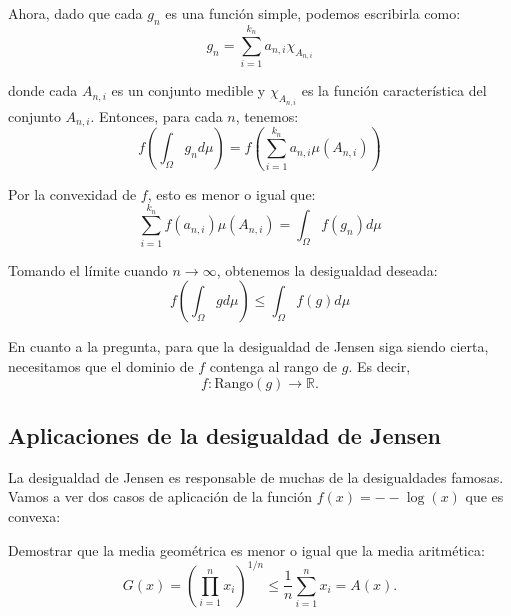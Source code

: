 \begin{paracol}{2}
{\begin{ejer}
Ahora, dado que cada $g_n$ es una función simple, podemos escribirla como:
$$g_n = \sum_{i=1}^{k_n} a_{n,i} \chi_{A_{n,i}}$$

donde cada $A_{n,i}$ es un conjunto medible y $\chi_{A_{n,i}}$ es la función característica del conjunto $A_{n,i}$. Entonces, para cada $n$, tenemos:
$$f\left(\int_\Omega g_n d\mu\right) = f\left(\sum_{i=1}^{k_n} a_{n,i} \mu(A_{n,i})\right)$$

Por la convexidad de $f$, esto es menor o igual que:
$$\sum_{i=1}^{k_n} f(a_{n,i}) \mu(A_{n,i}) = \int_\Omega f(g_n) d\mu$$

Tomando el límite cuando $n \to \infty$, obtenemos la desigualdad deseada:
$$f\left(\int_\Omega g d\mu\right) \leq \int_\Omega f(g) d\mu$$

En cuanto a la pregunta, para que la desigualdad de Jensen siga siendo cierta, necesitamos que el dominio de $f$ contenga al rango de $g$. Es decir, $$f: \text{Rango}(g) \to \mathbb{R}.$$
\end{ejer}
}

\subsection{Aplicaciones de la desigualdad de Jensen}

La desigualdad de Jensen es responsable de muchas de la desigualdades famosas. Vamos a ver dos casos de aplicación de la función $f(x) = --\log(x)$ que es convexa:

\begin{proposicion} Demostrar que la media geométrica es menor o igual que la media aritmética:
    $$G(x)=\left(\displaystyle\prod_{i=1}^n x_i\right)^{1/n}\leq \dfrac{1}{n} \sum_{i=1}^n x_i=A(x).$$


\end{proposicion}
\end{paracol}
